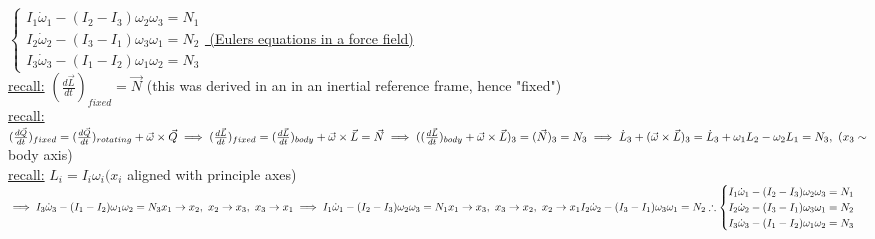 \documentclass[12pt]{amsart}
\begin{document}
\begin{enumerate}
\underline{
$\begin{cases}
	I_1 \dot{\omega}_1 -(I_2 - I_3) \omega_2 \omega_3 = N_1\\
	I_2 \dot{\omega}_2 - (I_3 - I_1) \omega_3 \omega_1 = N_2\\
	I_3 \dot{\omega}_3 - (I_1 - I_2) \omega_1 \omega_2 = N_3
\end{cases}$ (Eulers equations in a force field)}\\
\underline{recall:} $(\frac{d \vec{L}}{dt})_{fixed}=\vec{N}$ (this was derived in an in an inertial reference frame, hence "fixed")\\
\underline{recall:} $( \frac{d \vec{Q}}{dt})_{fixed} = (\frac{d \vec{Q}}{dt})_{rotating} + \vec{\omega} \times \vec{Q}\\
\implies (\frac{d \vec{L}}{dt})_{fixed} = ( \frac{d \vec{L}}{dt})_{body} + \vec{\omega} \times \vec{L} = \vec{N}\\
\implies (( \frac{d \vec{L}}{dt})_{body} + \vec{\omega} \times \vec{L})_3 = ( \vec{N})_3 = N_3\\
\implies \dot{L}_3 + ( \vec{\omega} \times \vec{L})_3 = \dot{L}_3 + \omega_1 L_2 - \omega_2 L_1 = N_3,\,\, (x_3 \sim$ body axis)\\
\underline{recall:} $L_i = I_i \omega_i (x_i$ aligned with principle axes)\\
$\implies I_3 \dot{\omega}_3 - (I_1 - I_2) \omega_1 \omega_2 = N_3\\
x_1 \rightarrow x_2,\,\, x_2 \rightarrow x_3,\,\, x_3 \rightarrow x_1\\
\implies I_1 \dot{\omega}_1 - (I_2 - I_3)\omega_2 \omega_3 = N_1\\
x_1 \rightarrow x_3,\,\, x_3 \rightarrow x_2,\,\, x_2 \rightarrow x_1\\
I_2 \dot{\omega}_2 - (I_3 - I_1) \omega_3 \omega_1 = N_2\\
\therefore
\begin{cases}
	I_1 \dot{\omega}_1 - (I_2 - I_3) \omega_2 \omega_3 = N_1\\
	I_2 \dot{\omega}_2 - (I_3 - I_1) \omega_3 \omega_1 = N_2\\
	I_3 \dot{\omega}_3 - (I_1 - I_2) \omega_1 \omega_2 = N_3
\end{cases}$


\hdashrule[0.5ex][c]{\linewidth}{0.5pt}{1.5mm}


\end{enumerate}
\end{document}
